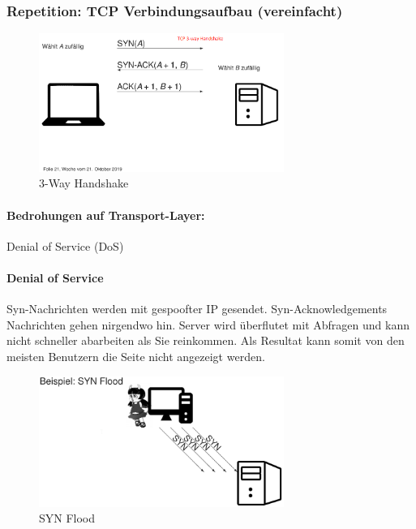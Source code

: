 \documentclass[10pt,a4paper]{article}
\begin{document}
\subsubsection*{Repetition: TCP Verbindungsaufbau (vereinfacht)}
\begin{figure}[H]
    \begin{center}
    \includegraphics[width=8cm]{images/Repetition_3_way_handshake.png}
    \caption{3-Way Handshake}
    \label{3-Way Handshake}
    \end{center}
\end{figure}

\paragraph*{Bedrohungen auf Transport-Layer:} Denial of Service (DoS)
\paragraph*{Denial of Service}Syn-Nachrichten werden mit gespoofter IP gesendet. Syn-Acknowledgements Nachrichten gehen nirgendwo hin.
Server wird überflutet mit Abfragen und kann nicht schneller abarbeiten als Sie reinkommen.
Als Resultat kann somit von den meisten Benutzern die Seite nicht angezeigt werden.
\begin{figure}[H]
    \begin{center}
    \includegraphics[width=8cm]{images/Syn-flood.png}
    \caption{SYN Flood}
    \label{Syn Flood}
    \end{center}
\end{figure}
\end{document}
